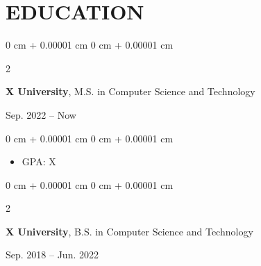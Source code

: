 \documentclass[10pt, letterpaper]{article}
\newenvironment{highlights}{
    \begin{itemize}[
        topsep=0.10 cm,
        parsep=0.10 cm,
        partopsep=0pt,
        itemsep=0pt,
        leftmargin=0 cm + 10pt
    ]
}{
    \end{itemize}
} %
\newenvironment{highlightsforbulletentries}{
    \begin{itemize}[
        topsep=0.10 cm,
        parsep=0.10 cm,
        partopsep=0pt,
        itemsep=0pt,
        leftmargin=10pt
    ]
}{
    \end{itemize}
} %
\newenvironment{onecolentry}{
    \begin{adjustwidth}{
        0 cm + 0.00001 cm
    }{
        0 cm + 0.00001 cm
    }
}{
    \end{adjustwidth}
} %
\newenvironment{twocolentry}[2][]{
    \onecolentry
    \def\secondColumn{#2}
    \setcolumnwidth{\fill, 4.5 cm}
    \begin{paracol}{2}
}{
    \switchcolumn \raggedleft \secondColumn
    \end{paracol}
    \endonecolentry
} %
\begin{document}








\section{EDUCATION}

\begin{twocolentry}{Sep. 2022 – Now}
\textbf{X University}, M.S. in Computer Science and Technology
\end{twocolentry}

\vspace{0.10 cm}

\begin{onecolentry}
\begin{highlights}
\item GPA: X
\end{highlights}
\end{onecolentry}

\vspace{0.20 cm}

\begin{twocolentry}{Sep. 2018 – Jun. 2022}
\textbf{X University}, B.S. in Computer Science and Technology
\end{twocolentry}
\end{document}
